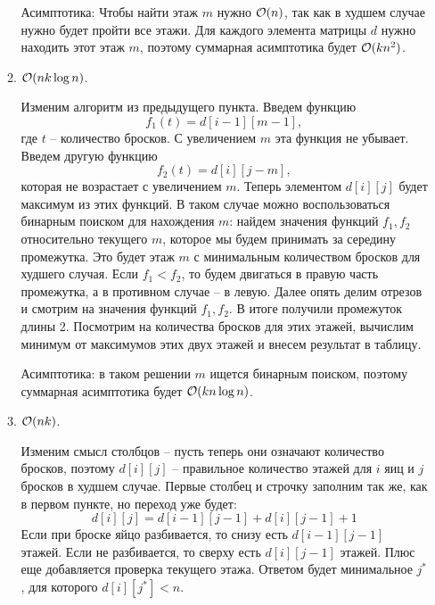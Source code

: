 \begin{enumerate}
\begin{enumerate}
\begin{solution}
            Асимптотика:
            Чтобы найти этаж $m$ нужно $\mathcal{O}(n)$, так как в худшем случае нужно будет пройти все этажи. Для каждого элемента матрицы $d$ нужно находить этот этаж $m$, поэтому суммарная асимптотика будет $\mathcal{O}(kn^2)$.
        \end{solution}
        \item $\mathcal{O}(n k \log{n})$.
        \begin{solution}
            Изменим алгоритм из предыдущего пункта. Введем функцию
            \begin{equation}
                f_1(t) = d[i-1][m-1],
            \end{equation}
            где $t$ -- количество бросков. С увеличением $m$ эта функция не убывает. Введем другую функцию
            \begin{equation}
                f_2(t) = d[i][j-m],
            \end{equation}
            которая не возрастает с увеличением $m$. Теперь элементом $d[i][j]$ будет максимум из этих функций. В таком случае можно воспользоваться бинарным поиском для нахождения $m$: найдем значения функций $f_1, f_2$ относительно текущего $m$, которое мы будем принимать за середину промежутка. Это будет этаж $m$ с минимальным количеством бросков для худшего случая. Если $f_1 < f_2$, то будем двигаться в правую часть промежутка, а в противном случае -- в левую. Далее опять делим отрезов и смотрим на значения функций $f_1, f_2$. В итоге получили промежуток длины 2. Посмотрим на количества бросков для этих этажей, вычислим минимум от максимумов этих двух этажей и внесем результат в таблицу.

            Асимптотика:
            в таком решении $m$ ищется бинарным поиском, поэтому суммарная асимптотика будет $\mathcal{O}(kn\log n)$.
        \end{solution}
        \item $\mathcal{O}(n k)$.
        \begin{solution}
            Изменим смысл столбцов -- пусть теперь они означают количество бросков, поэтому $d[i][j]$ -- правильное количество этажей для $i$ яиц и $j$ бросков в худшем случае. Первые столбец и строчку заполним так же, как в первом пункте, но переход уже будет:
            \begin{equation}
                d[i][j] = d[i-1][j-1]+d[i][j-1]+1
            \end{equation}
            Если при броске яйцо разбивается, то снизу есть $d[i-1][j-1]$ этажей. Если не разбивается, то сверху есть $d[i][j-1]$ этажей. Плюс еще добавляется проверка текущего этажа. Ответом будет минимальное $j^*$, для которого $d[i][j^*]<n$.


\end{solution}
\end{enumerate}
\end{enumerate}
